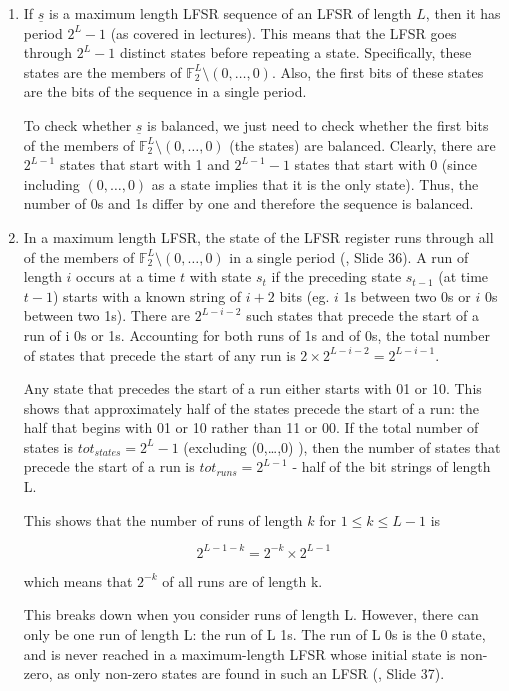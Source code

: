 \begin{enumerate}

\item If $\underline{s}$ is a maximum length LFSR sequence of an LFSR of length
$L$, then it has period $2^L-1$ (as covered in lectures). This means that the
LFSR goes through $2^L-1$ distinct states before repeating a state.
Specifically, these states are the members of $\mathbb{F}_2^L \setminus
(0,\dots,0)$. Also, the first bits of these states are the bits of the sequence
in a single period.

To check whether $\underline{s}$ is balanced, we just need to check whether the
first bits of the members of $\mathbb{F}_2^L \setminus (0,\dots,0)$ (the states)
are balanced. Clearly, there are $2^{L-1}$ states that start with 1 and
$2^{L-1}-1$ states that start with 0 (since including $(0,\dots,0)$ as a state
implies that it is the only state). Thus, the number of 0s and 1s differ by one
and therefore the sequence is balanced.

\item In a maximum length LFSR, the state of the LFSR register runs through all
of the members of $\mathbb{F}_2^L \setminus (0,\dots,0)$ in a single period
(\cite{slides}, Slide 36). A run of length $i$ occurs at a time $t$ with state
$s_t$ if the preceding state $s_{t-1}$ (at time $t-1$) starts with a known
string of $i+2$ bits (eg. $i$ 1s between two 0s or $i$ 0s between two 1s). There
are $2^{L-i-2}$ such states that precede the start of a run of i 0s or 1s.
Accounting for both runs of 1s and of 0s, the total number of states that
precede the start of any run is $2 \times 2^{L-i-2} = 2^{L-i-1}$.

Any state that precedes the start of a run either starts with 01 or 10. This
shows that approximately half of the states precede the start of a run: the half
that begins with 01 or 10 rather than 11 or 00. If the total number of states is
$tot_{states} = 2^L-1$ (excluding (0,\dots,0) ), then the number of states that
precede the start of a run is $tot_{runs} = 2^{L-1}$ - half of the bit strings
of length L.

This shows that the number of runs of length $k$ for $1 \le k \le L-1$ is

\[2^{L-1-k} = 2^{-k} \times 2^{L-1}\]

which means that $2^{-k}$ of all runs are of length k.

This breaks down when you consider runs of length L. However, there can only be
one run of length L: the run of L 1s. The run of L 0s is the 0 state, and is
never reached in a maximum-length LFSR whose initial state is non-zero, as only
non-zero states are found in such an LFSR (\cite{slides}, Slide 37).

\end{enumerate}
